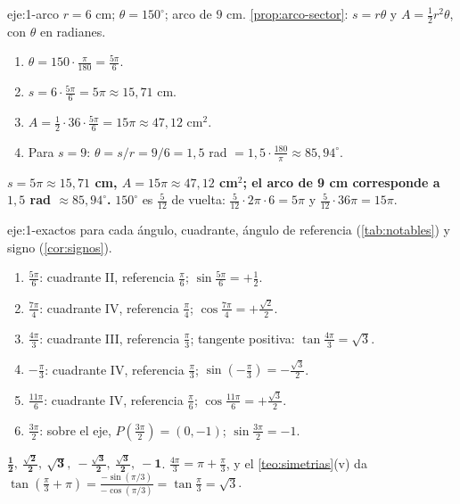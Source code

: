\begin{solucion}{eje:1-arco}
\datos $r=6$ cm; $\theta=150^{\circ}$; arco de $9$ cm.
\planteamiento \cref{prop:arco-sector}: $s=r\theta$ y $A=\frac12r^{2}\theta$, con $\theta$ en radianes.
\pasos
\begin{enumerate}[label=\arabic*.]
  \item $\theta=150\cdot\frac{\pi}{180}=\frac{5\pi}{6}$.
  \item $s=6\cdot\frac{5\pi}{6}=5\pi\approx15{,}71$ cm.
  \item $A=\frac12\cdot36\cdot\frac{5\pi}{6}=15\pi\approx47{,}12$ cm$^{2}$.
  \item Para $s=9$: $\theta=s/r=9/6=1{,}5$ rad $=1{,}5\cdot\frac{180}{\pi}\approx85{,}94^{\circ}$.
\end{enumerate}
\resultado \textbf{$s=5\pi\approx15{,}71$ cm, $A=15\pi\approx47{,}12$ cm$^{2}$; el arco de 9 cm corresponde a $1{,}5$ rad $\approx85{,}94^{\circ}$.}
\comprobacion $150^{\circ}$ es $\frac{5}{12}$ de vuelta: $\frac{5}{12}\cdot2\pi\cdot6=5\pi$ y $\frac{5}{12}\cdot36\pi=15\pi$.
\end{solucion}

\begin{solucion}{eje:1-exactos}
\planteamiento para cada ángulo, cuadrante, ángulo de referencia (\cref{tab:notables}) y signo (\cref{cor:signos}).
\pasos
\begin{enumerate}[label=\arabic*.]
  \item $\frac{5\pi}{6}$: cuadrante II, referencia $\frac{\pi}{6}$; $\sin\frac{5\pi}{6}=+\frac12$.
  \item $\frac{7\pi}{4}$: cuadrante IV, referencia $\frac{\pi}{4}$; $\cos\frac{7\pi}{4}=+\frac{\sqrt2}{2}$.
  \item $\frac{4\pi}{3}$: cuadrante III, referencia $\frac{\pi}{3}$; tangente positiva: $\tan\frac{4\pi}{3}=\sqrt3$.
  \item $-\frac{\pi}{3}$: cuadrante IV, referencia $\frac{\pi}{3}$; $\sin(-\frac{\pi}{3})=-\frac{\sqrt3}{2}$.
  \item $\frac{11\pi}{6}$: cuadrante IV, referencia $\frac{\pi}{6}$; $\cos\frac{11\pi}{6}=+\frac{\sqrt3}{2}$.
  \item $\frac{3\pi}{2}$: sobre el eje, $P(\frac{3\pi}{2})=(0,-1)$; $\sin\frac{3\pi}{2}=-1$.
\end{enumerate}
\resultado $\mathbf{\tfrac12,\ \tfrac{\sqrt2}{2},\ \sqrt3,\ -\tfrac{\sqrt3}{2},\ \tfrac{\sqrt3}{2},\ -1}$.
\comprobacion $\frac{4\pi}{3}=\pi+\frac{\pi}{3}$, y el \cref{teo:simetrias}(v) da $\tan(\frac{\pi}{3}+\pi)=\frac{-\sin(\pi/3)}{-\cos(\pi/3)}=\tan\frac{\pi}{3}=\sqrt3$.
\end{solucion}

